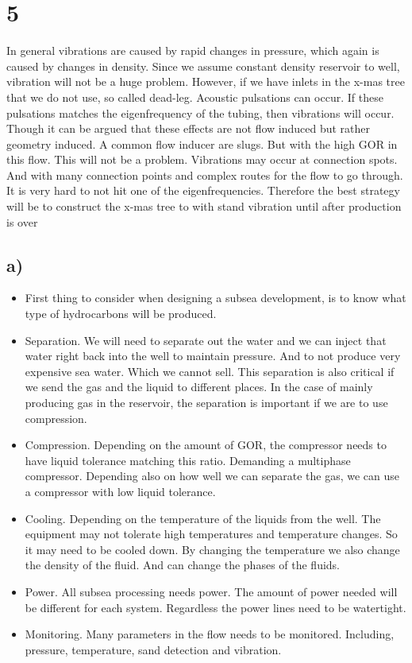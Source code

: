 \documentclass[DIV=calc, paper=a4, fontsize=13pt, twocolumn]{scrartcl}	 %
\begin{document}
\section*{5}
In general vibrations are caused by rapid changes in pressure, which again is caused by changes in density. Since we assume constant density reservoir to well, vibration will not be a huge problem.
\newline
However, if we have inlets in the x-mas tree that we do not use, so called dead-leg. Acoustic pulsations can occur. If these pulsations matches the eigenfrequency of the tubing, then vibrations will occur. Though it can be argued that these effects are not flow induced but rather geometry induced. 
\newline
A common flow inducer are slugs. But with the high GOR in this flow. This will not be a problem. 
\newline
Vibrations may occur at connection spots. And with many connection points and complex routes for the flow to go through. It is very hard to not hit one of the eigenfrequencies. Therefore the best strategy will be to construct the x-mas tree to with stand vibration until after production is over  

\subsection*{a)}
\begin{itemize}
\item First thing to consider when designing a subsea development, is to know what type of hydrocarbons will be produced. 
\item Separation.  We will need to separate out the water and we can inject that water right back into the well to maintain pressure. And to not produce very expensive sea water. Which we cannot sell. This separation is also critical if we send the gas and the liquid to different places. In the case of mainly producing gas in the reservoir, the separation is important if we are to use compression.
\item Compression. Depending on the amount of GOR, the compressor needs to have liquid tolerance matching this ratio. Demanding a multiphase compressor. Depending also on how well we can separate the gas, we can use a compressor with low liquid tolerance. 
\item Cooling. Depending on the temperature of the liquids from the well. The equipment may not tolerate high temperatures and temperature changes. So it may need to be cooled down. By changing the temperature we also change the density of the fluid. And can change the phases of the fluids.
\item Power. All subsea processing needs power. The amount of power needed will be different for each system. Regardless the power lines need to be watertight. 
\item Monitoring. Many parameters in the flow needs to be monitored. Including, pressure, temperature, sand detection and vibration.
\end{itemize}
\end{document}

